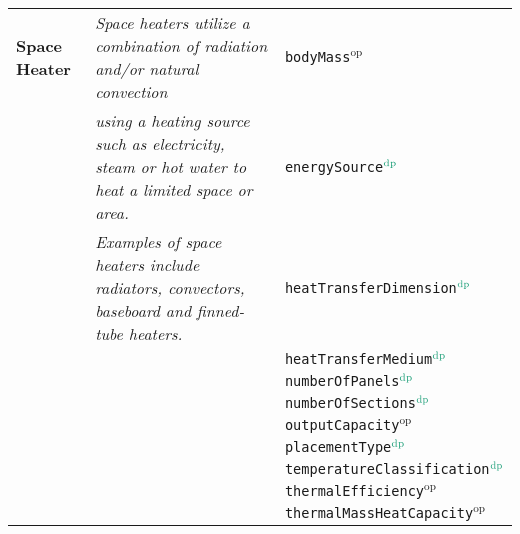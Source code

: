 {\begin{tabular}{lll}
\textbf{Space Heater}             & \textit{Space heaters utilize a combination of radiation and/or natural convection}                             & \texttt{bodyMass}$^\textrm{op}$                  \\
                                  & \textit{using a heating source such as electricity, steam or hot water to heat a limited space or area.}        & \texttt{energySource}$\color{DarkGreen}^\textrm{dp}$              \\
                                  & \textit{Examples of space heaters include radiators, convectors, baseboard and finned-tube heaters.}            & \texttt{heatTransferDimension}$\color{DarkGreen}^\textrm{dp}$     \\
                                  &                                                                                                        & \texttt{heatTransferMedium}$\color{DarkGreen}^\textrm{dp}$        \\
                                  &                                                                                                        & \texttt{numberOfPanels}$\color{DarkGreen}^\textrm{dp}$            \\
                                  &                                                                                                        & \texttt{numberOfSections}$\color{DarkGreen}^\textrm{dp}$          \\
                                  &                                                                                                        & \texttt{outputCapacity}$^\textrm{op}$            \\
                                  &                                                                                                        & \texttt{placementType}$\color{DarkGreen}^\textrm{dp}$             \\
                                  &                                                                                                        & \texttt{temperatureClassification}$\color{DarkGreen}^\textrm{dp}$ \\
                                  &                                                                                                        & \texttt{thermalEfficiency}$^\textrm{op}$         \\
                                  &                                                                                                        & \texttt{thermalMassHeatCapacity}$^\textrm{op}$   \\ \midrule

\end{tabular}}
